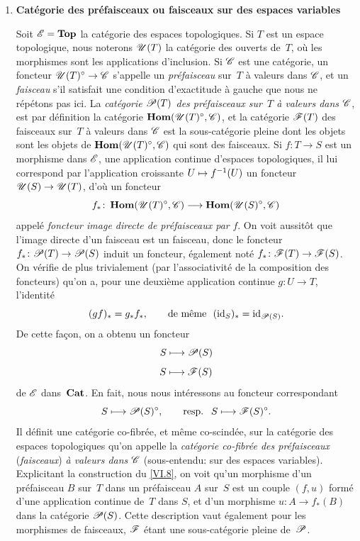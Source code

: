 \begin{enumerate}
\medskip
\item[b)] \textbf{Catégorie des préfaisceaux ou faisceaux sur
des espaces variables}

Soit $\cal{E}=\mathbf{Top}$ la cat\'egorie des espaces topologiques.
Si $T$ est un espace topologique, nous noterons $\cal{U}(T)$ la
cat\'egorie des ouverts de~$T$, o\`u les morphismes sont les
applications d'inclusion. Si $\cal{C}$ est une cat\'egorie, un
foncteur $\cal{U}(T)^\circ\to \cal{C}$ s'appelle un
\emph{préfaisceau} sur~$T$ \`a valeurs dans $\cal{C}$, et un
\emph{faisceau} s'il satisfait une condition d'exactitude \`a gauche
que nous ne r\'ep\'etons pas ici. La \emph{catégorie
$\cal{P}(T)$ des préfaisceaux sur~$T$ à valeurs dans
$\cal{C}$}, est par d\'efinition la cat\'egorie
$\SheafHom(\cal{U}(T)^\circ,\cal{C})$, et la cat\'egorie
$\cal{F}(T)$ des faisceaux sur~$T$ \`a valeurs dans $\cal{C}$ est la
sous-cat\'egorie pleine dont les objets sont les objets de
$\SheafHom(\cal{U}(T)^\circ,\cal{C})$ qui sont des faisceaux. Si
$f\colon T\to S$ est un morphisme dans $\cal{E}$, \ie une
application continue d'espaces topologiques, il lui correspond par
l'application croissante $U\mto f^{-1}(U)$ un foncteur
$\cal{U}(S)\to \cal{U}(T)$, d'o\`u un foncteur
$$
f_*\colon\SheafHom(\cal{U}(T)^\circ,\cal{C})\to
\SheafHom(\cal{U}(S)^\circ,\cal{C})
$$
appel\'e \emph{foncteur image directe de préfaisceaux par}
$f$. On voit aussit\^ot que l'image directe d'un faisceau est un
faisceau, donc le foncteur
$f_*\colon \cal{P}(T)\to\cal{P}(S)$
induit un foncteur, \'egalement not\'e
$f_*\colon\cal{F}(T)\to\cal{F}(S)$.
On v\'erifie de plus trivialement (par l'associativit\'e de la
composition des foncteurs) qu'on a, pour une deuxi\`eme application
continue $g\colon U\to T$, l'identit\'e
$$
(gf)_* =g_*f_*,\qquad
\text{de même }\ (\id_S)_*=\id_{\cal{P}(S)}.
$$
De cette fa\c con, on a obtenu un foncteur
$$
S\mto \cal{P}(S)
$$
\resp $$
S\mto \cal{F}(S)
$$
de
$\cal{E}$ dans~$\mathbf{Cat}$. En fait, nous nous int\'eressons au
foncteur correspondant
$$
S\mto \cal{P}(S)^\circ,\qquad\text{\resp~}S\mto
\cal{F}(S)^\circ.
$$
Il d\'efinit une cat\'egorie co-fibr\'ee, et m\^eme
co-scind\'ee, sur la cat\'egorie des espaces topologiques qu'on
appelle la \emph{catégorie co-fibrée des préfaisceaux}
(\resp \emph{faisceaux}) \emph{à valeurs dans} $\cal{C}$
(sous-entendu: sur des espaces variables). Explicitant la construction
du \No \ref{VI.8}, on voit qu'un morphisme d'un pr\'efaisceau $B$ sur~$T$
dans un pr\'efaisceau $A$ sur~$S$ est un couple $(f,u)$ form\'e
d'une application continue de~$T$ dans $S$, et d'un morphisme $u\colon
A\to f_*(B)$ dans la cat\'egorie $\cal{P}(S)$. Cette description
vaut \'egalement pour les morphismes de faisceaux, $\cal{F}$
\'etant une sous-cat\'egorie pleine de~$\cal{P}$.


\end{enumerate}
